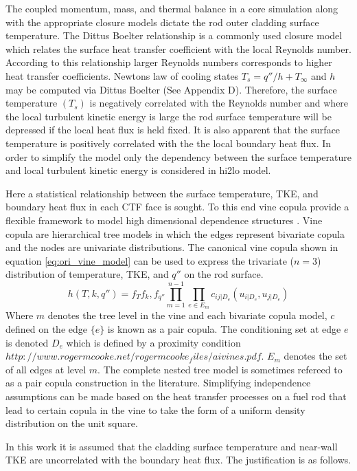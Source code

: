 The coupled momentum, mass, and thermal balance in a core simulation along with the appropriate closure models dictate the rod outer cladding surface temperature.  The Dittus Boelter relationship is a commonly used closure model which relates the surface heat transfer coefficient with the local Reynolds number.  According to this relationship larger Reynolds numbers corresponds to higher heat transfer coefficients.   Newtons law of cooling states $T_s = q''/h + T_{\infty}$ and $h$ may be computed via Dittus Boelter (See Appendix D).  Therefore, the surface temperature $(T_s)$ is negatively correlated with the Reynolds number and where the local turbulent kinetic energy is large the rod surface temperature will be depressed if the local heat flux is held fixed.  It is also apparent that the surface temperature is positively correlated with the the local boundary heat flux.  In order to simplify the model only the dependency between the surface temperature and local turbulent kinetic energy is considered in hi2lo model.

Here a statistical relationship between the surface temperature, TKE, and boundary heat flux in each CTF face is sought.  To this end vine copula provide a flexible framework to model high dimensional dependence structures \cite{Joe2015}. Vine copula are hierarchical tree models in which the edges represent bivariate copula and the nodes are univariate distributions.  The canonical vine copula shown in equation \ref{eq:ori_vine_model} can be used to express the trivariate ($n=3$) distribution of temperature, TKE, and $q''$ on the rod surface. 
\begin{equation}
h(T, k, q'') = f_T f_k, f_{q''} \prod_{m=1}^{n-1} \prod_{e \in E_m} c_{ij|D_e}(u_{i|D_e}, u_{j|D_e})
\label{eq:ori_vine_model}
\end{equation}
Where $m$ denotes the tree level in the vine and each bivariate copula model, $c$ defined on the edge $\{e\}$ is known as a pair copula.  The conditioning set at edge $e$ is denoted $D_e$ which is defined by a proximity condition $ http://www.rogermcooke.net/rogermcooke_files/aivines.pdf$. $E_m$ denotes the set of all edges at level $m$. The complete nested tree model is sometimes refereed to as a pair copula construction in the literature.  Simplifying independence assumptions can be made based on the heat transfer processes on a fuel rod that lead to certain copula in the vine to take the form of a uniform density distribution on the unit square.

In this work it is assumed that the cladding surface temperature and near-wall TKE are uncorrelated with the boundary heat flux.  The justification is as follows.

